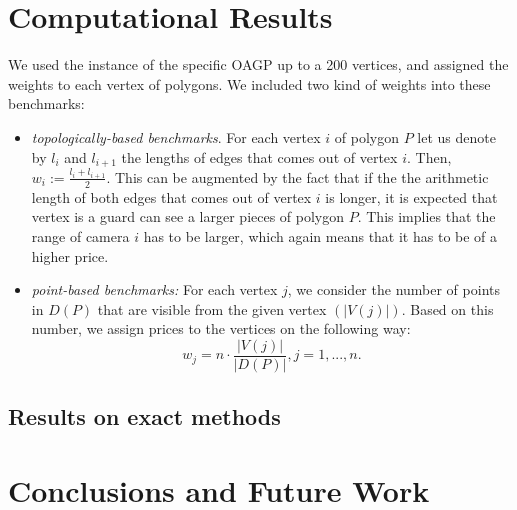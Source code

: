 \documentclass[runningheads,a4paper]{elsarticle}
\begin{document}
	\section{Computational Results}
	We used the instance of the specific OAGP up to a 200 vertices, and assigned the weights to each vertex of polygons. We included two kind of weights into these benchmarks:
	\begin{itemize}
		\item \emph{topologically-based benchmarks}. For each vertex $i$ of polygon $P$ let us denote by $l_i$ and $l_{i+1}$ the lengths of edges that comes out of vertex $i$. Then, $w_i := \frac{l_i + l_{i+1}}{2}$. This can be augmented by the fact that if the the arithmetic length of both edges that comes out of vertex $i$ is longer, it is expected that vertex is a guard can see a larger pieces of polygon $P$. This implies that the range of camera $i$ has to be larger, which again means that it has to be of a higher price.
		\item \emph{point-based benchmarks:} For each vertex $j$, we consider the number of points in $D(P)$ that are visible from the given vertex $(|V(j)|)$. Based on this number, we assign prices to the vertices on the following way:
		\begin{equation}
		w_j = n \cdot \frac{|V(j)|}{|D(P)|}, j=1,...,n.
		\end{equation}
	\end{itemize}
	\subsection{Results on exact methods}
	\section{Conclusions and Future Work}
	
	
	
	
	
	
	
\end{document}
